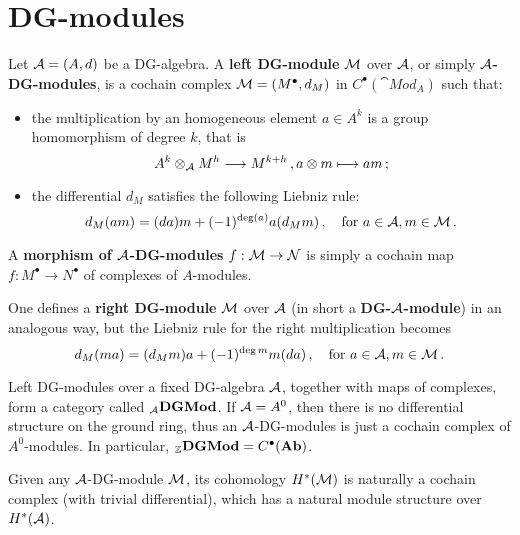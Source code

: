 
\section{DG-modules}

	\begin{df}
		Let $\mathcal{A} = (A,d)$ be a DG-algebra.
		A \textbf{left DG-module} $\mathcal{M}$ over $\mathcal{A}$, or simply \textbf{$\mathcal{A}$-DG-modules},
		is a cochain complex $\mathcal{M} = (M^{\bullet},d_{M})$ in $C^{\bullet}(\cat{Mod}_{A})$
		such that:
		\begin{itemize}
			\item the multiplication by an homogeneous element $a \in A^{k}$
			is a group homomorphism of degree $k$, that is
			\begin{equation*}
				A^{k} \otimes_{\mathcal{A}} M^{h} \longrightarrow M^{k+h}\,,
				a \otimes m \longmapsto am\,;
			\end{equation*}
			
			\item the differential $d_{M}$ satisfies the following Liebniz rule:
			\begin{equation}\label{graded-mod-liebniz}
				d_{M}(am) = (da)m + (-1)^{\deg(a)}a(d_{M}m)\,,
				\quad \text{for } a \in \mathcal{A}, m \in \mathcal{M}\,.
			\end{equation}
		\end{itemize}
		A \textbf{morphism of $\mathcal{A}$-DG-modules} $f:\mathcal{M} \to \mathcal{N}$
		is simply a cochain map $f:M^{\bullet} \to N^{\bullet}$
		of complexes of $A$-modules.
		
		One defines a \textbf{right DG-module} $\mathcal{M}$
		over $\mathcal{A}$ (in short a \textbf{DG-$\mathcal{A}$-module})
		in an analogous way, but the Liebniz rule for the
		right multiplication becomes
		\begin{equation*}
			d_{M}(ma) = (d_{M}m)a + (-1)^{\deg{m}}m(da)\,,
			\quad \text{for } a \in \mathcal{A}, m \in \mathcal{M}\,.
		\end{equation*}
	\end{df}
	
	\begin{ex}
		Left DG-modules over a fixed DG-algebra $\mathcal{A}$, together with maps of complexes,
		form a category called ${}_{\mathcal{A}}{\normalfont\textbf{DGMod}}$. 
		If $\mathcal{A} = A^{0}$, then there is no differential structure
		on the ground ring, thus an $\mathcal{A}$-DG-modules is just a cochain complex of $A^{0}$-modules.
		In particular, ${}_{{\mathbb Z}}{\normalfont\textbf{DGMod}} = C^{\bullet}({\normalfont\textbf{Ab}})$.
	\end{ex}
	
	\begin{ex}
		Given any $\mathcal{A}$-DG-module $\mathcal{M}$, its cohomology $H^{*}(\mathcal{M})$ is naturally
		a cochain complex (with trivial differential), which has a natural module structure
		over %
		$H^*(\mathcal{A})$.
	\end{ex}
	
